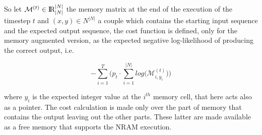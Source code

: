 So let $\mathcal{M}^{(t)} \in \textrm{I\!R}^{|N|}_{|N|}$ the memory matrix at the end of the execution of the timestep $t$ and $(x, y) \in N^{|N|}$ a couple which contains the starting input sequence and the expected output sequence, the cost function is defined, only for the memory augmented version, as the expected negative log-likelihood of producing the correct output, i.e.
\begin{center}
	\begin{equation}
		-\sum\limits_{i=1}^{T}\Bigg(p_{t}\cdot\sum\limits_{i=1}^{|N|}log\Big(\mathcal{M}_{i, y_{i}}^{(t)}\Big)\Bigg)
	\end{equation}
\end{center}
where $y_i$ is the expected integer value at the $i^{th}$ memory cell, that here acts also as a pointer. The cost calculation is made only over the part of memory that contains the output leaving out the other parts. These latter are made available as a free memory that supports the NRAM execution.